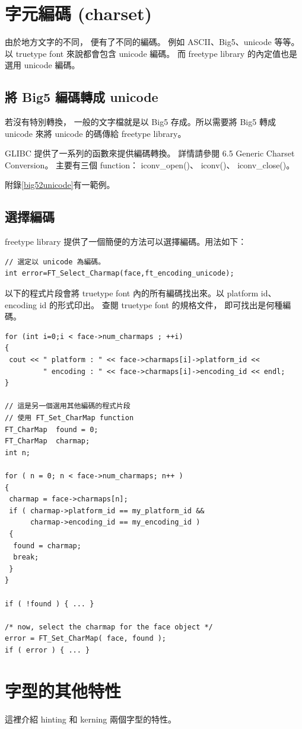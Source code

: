 \documentclass[12pt,a4]{article}
\begin{document}
\begin{CJK}{UTF8}{bsmi}
\section{字元編碼 (charset)}
由於地方文字的不同， 便有了不同的編碼。 例如 ASCII、Big5、unicode 等等。
以 truetype font 來說都會包含 unicode 編碼。 而 freetype library 的內定值也是選用 
unicode 編碼。
\subsection{將 Big5 編碼轉成 unicode}
若沒有特別轉換， 一般的文字檔就是以 Big5 存成。所以需要將 Big5 轉成 unicode 
來將 unicode 的碼傳給 freetype library。

GLIBC 提供了一系列的函數來提供編碼轉換。 詳情請參閱\cite{glibc}
6.5 Generic Charset Conversion。 主要有三個 function： iconv\_{}open()、 iconv()、 
iconv\_{}close()。

附錄\ref{big52unicode}有一範例。
\subsection{選擇編碼}
freetype library 提供了一個簡便的方法可以選擇編碼。用法如下：
\begin{Verbatim}[commandchars=@\[\]]
// 選定以 unicode 為編碼。
int error=FT_Select_Charmap(face,ft_encoding_unicode);
\end{Verbatim}
以下的程式片段會將 truetype font 內的所有編碼找出來。以 platform id、 encoding id
的形式印出。 查閱 truetype font 的規格文件， 即可找出是何種編碼。
\begin{Verbatim}[commandchars=@\$?]
for (int i=0;i < face->num_charmaps ; ++i)
{
 cout << " platform : " << face->charmaps[i]->platform_id << 
         " encoding : " << face->charmaps[i]->encoding_id << endl;
}

// 這是另一個選用其他編碼的程式片段
// 使用 FT_Set_CharMap function
FT_CharMap  found = 0;
FT_CharMap  charmap;
int n;

for ( n = 0; n < face->num_charmaps; n++ )
{
 charmap = face->charmaps[n];
 if ( charmap->platform_id == my_platform_id &&
      charmap->encoding_id == my_encoding_id )
 {
  found = charmap;
  break;
 }
}

if ( !found ) { ... }

/* now, select the charmap for the face object */
error = FT_Set_CharMap( face, found );
if ( error ) { ... }
\end{Verbatim}
\newpage
\section{字型的其他特性}
這裡介紹 hinting 和 kerning 兩個字型的特性。

\end{CJK}
\end{document}
